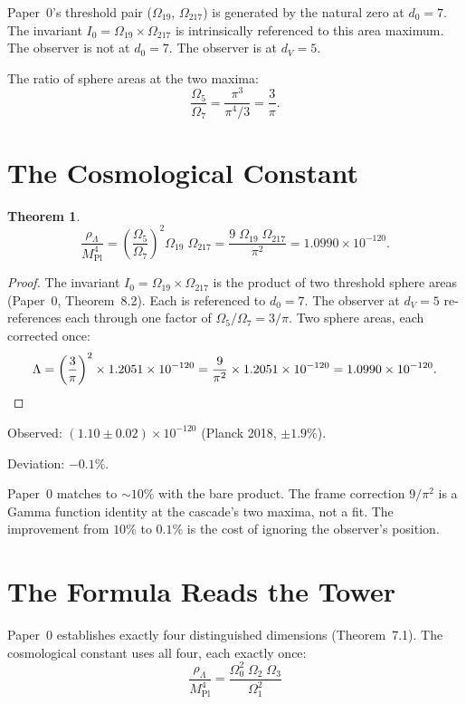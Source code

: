 \documentclass[11pt,a4paper]{article}
\newtheorem{theorem}{Theorem}[section]
\begin{document}
Paper~0's threshold pair ($\Omega_{19}$, $\Omega_{217}$) is generated by
the natural zero at $d_0 = 7$. The invariant
$I_0 = \Omega_{19}\times\Omega_{217}$ is intrinsically referenced to this
area maximum. The observer is not at $d_0 = 7$. The observer is at
$d_V = 5$.

The ratio of sphere areas at the two maxima:
\[
\frac{\Omega_5}{\Omega_7} = \frac{\pi^3}{\pi^4/3} = \frac{3}{\pi}.
\]

\section{The Cosmological Constant}

\begin{theorem}\label{thm:cc}
\[
\frac{\rho_\Lambda}{M^4_{\mathrm{Pl}}}
= \left(\frac{\Omega_5}{\Omega_7}\right)^2\Omega_{19}\;\Omega_{217}
= \frac{9\;\Omega_{19}\;\Omega_{217}}{\pi^2}
= 1.0990\times 10^{-120}.
\]
\end{theorem}

\begin{proof}
The invariant $I_0 = \Omega_{19}\times\Omega_{217}$ is the product of two
threshold sphere areas (Paper~0, Theorem~8.2). Each is referenced to
$d_0 = 7$. The observer at $d_V = 5$ re-references each through one factor
of $\Omega_5/\Omega_7 = 3/\pi$. Two sphere areas, each corrected once:
\[
\Lambda = \left(\frac{3}{\pi}\right)^2\times 1.2051\times 10^{-120}
= \frac{9}{\pi^2}\times 1.2051\times 10^{-120}
= 1.0990\times 10^{-120}.\qedhere
\]
\end{proof}

Observed: $(1.10\pm 0.02)\times 10^{-120}$ (Planck 2018, $\pm 1.9\%$).

Deviation: $-0.1\%$.

Paper~0 matches to $\sim\!10\%$ with the bare product. The frame
correction $9/\pi^2$ is a Gamma function identity at the cascade's two
maxima, not a fit. The improvement from $10\%$ to $0.1\%$ is the cost of
ignoring the observer's position.

\section{The Formula Reads the Tower}

Paper~0 establishes exactly four distinguished dimensions (Theorem~7.1).
The cosmological constant uses all four, each exactly once:
\[
\frac{\rho_\Lambda}{M^4_{\mathrm{Pl}}}
= \frac{\Omega_0^2\;\Omega_2\;\Omega_3}{\Omega_1^2}
\]
\end{document}

